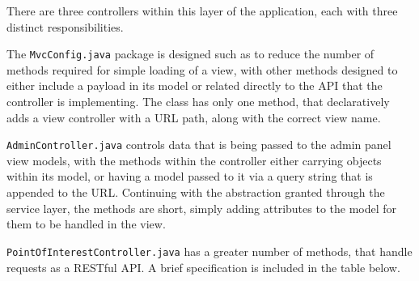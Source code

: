 There are three controllers within this layer of the application, each with three distinct responsibilities.

The \texttt{MvcConfig.java} package is designed such as to reduce the number of methods required for simple loading of a view, with other methods designed to either include a payload in its model or related directly to the API that the controller is implementing. The class has only one method, that declaratively adds a view controller with a URL path, along with the correct view name.

\texttt{AdminController.java} controls data that is being passed to the admin panel view models, with the methods within the controller either carrying objects within its model, or having a model passed to it via a query string that is appended to the URL. Continuing with the abstraction granted through the service layer, the methods are short, simply adding attributes to the model for them to be handled in the view.

\texttt{PointOfInterestController.java} has a greater number of methods, that handle requests as a RESTful API. A brief specification is included in the table below.

\begin{table}[h]
\centering
{}
\caption{API endpoints for /poi}
\label{tab:poi-endpoints}
\end{table}

